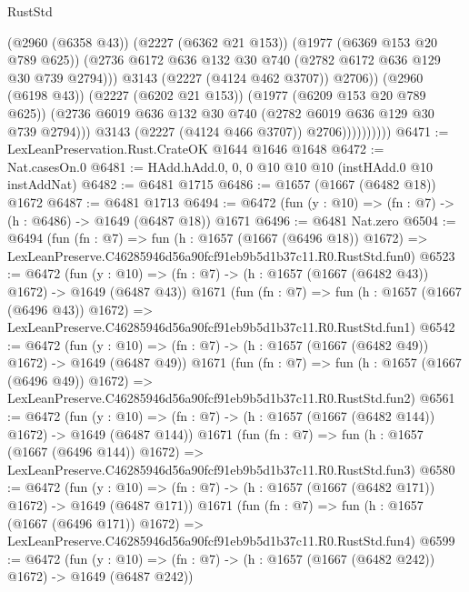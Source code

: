 \begin{lexlean}{RustStd}
\begin{coremodule}
                                (@2960 (@6358 @43))
                                (@2227 (@6362 @21 @153))
                                (@1977 (@6369 @153 @20 @789 @625))
                                (@2736
                                  @6172
                                  @636
                                  @132
                                  @30
                                  @740
                                  (@2782 @6172 @636 @129 @30 @739 @2794)))
                              @3143
                              (@2227 (@4124 @462 @3707))
                              @2706))
                          (@2960 (@6198 @43))
                          (@2227 (@6202 @21 @153))
                          (@1977 (@6209 @153 @20 @789 @625))
                          (@2736 @6019 @636 @132 @30 @740 (@2782 @6019 @636 @129 @30 @739 @2794)))
                        @3143
                        (@2227 (@4124 @466 @3707))
                        @2706))))))))))
@6471 := LexLeanPreservation.Rust.CrateOK @1644 @1646 @1648
@6472 := Nat.casesOn.{0}
@6481 := HAdd.hAdd.{0, 0, 0} @10 @10 @10 (instHAdd.{0} @10 instAddNat)
@6482 := @6481 @1715
@6486 := @1657 (@1667 (@6482 @18)) @1672
@6487 := @6481 @1713
@6494 := @6472 (fun (y : @10) => (fn : @7) -> (h : @6486) -> @1649 (@6487 @18)) @1671
@6496 := @6481 Nat.zero
@6504 := @6494
    (fun (fn : @7) =>
    fun (h : @1657 (@1667 (@6496 @18)) @1672) =>
    LexLeanPreserve.C46285946d56a90fcf91eb9b5d1b37c11.R0.RustStd.fun0)
@6523 := @6472
    (fun (y : @10) => (fn : @7) -> (h : @1657 (@1667 (@6482 @43)) @1672) -> @1649 (@6487 @43))
    @1671
    (fun (fn : @7) =>
    fun (h : @1657 (@1667 (@6496 @43)) @1672) =>
    LexLeanPreserve.C46285946d56a90fcf91eb9b5d1b37c11.R0.RustStd.fun1)
@6542 := @6472
    (fun (y : @10) => (fn : @7) -> (h : @1657 (@1667 (@6482 @49)) @1672) -> @1649 (@6487 @49))
    @1671
    (fun (fn : @7) =>
    fun (h : @1657 (@1667 (@6496 @49)) @1672) =>
    LexLeanPreserve.C46285946d56a90fcf91eb9b5d1b37c11.R0.RustStd.fun2)
@6561 := @6472
    (fun (y : @10) => (fn : @7) -> (h : @1657 (@1667 (@6482 @144)) @1672) -> @1649 (@6487 @144))
    @1671
    (fun (fn : @7) =>
    fun (h : @1657 (@1667 (@6496 @144)) @1672) =>
    LexLeanPreserve.C46285946d56a90fcf91eb9b5d1b37c11.R0.RustStd.fun3)
@6580 := @6472
    (fun (y : @10) => (fn : @7) -> (h : @1657 (@1667 (@6482 @171)) @1672) -> @1649 (@6487 @171))
    @1671
    (fun (fn : @7) =>
    fun (h : @1657 (@1667 (@6496 @171)) @1672) =>
    LexLeanPreserve.C46285946d56a90fcf91eb9b5d1b37c11.R0.RustStd.fun4)
@6599 := @6472
    (fun (y : @10) => (fn : @7) -> (h : @1657 (@1667 (@6482 @242)) @1672) -> @1649 (@6487 @242))

\end{coremodule}
\end{lexlean}
